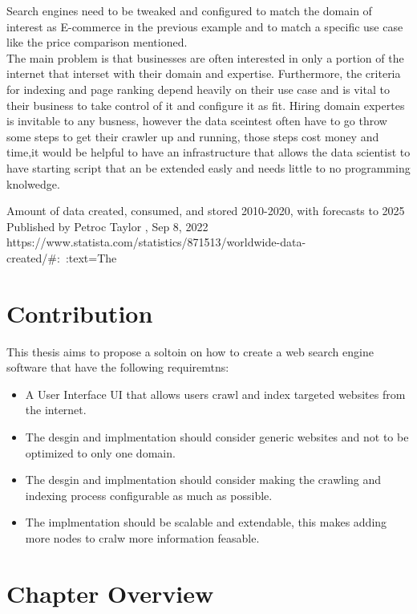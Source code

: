 Search engines need to be tweaked and configured to match the domain of interest as E-commerce in the previous example and to match a specific use case like the price comparison mentioned.\\

The main problem is that businesses are often interested in only a portion of the internet that interset with their domain and expertise. Furthermore, the criteria for indexing and page ranking depend heavily on their use case and is vital to their business to take control of it and configure it as fit. Hiring domain expertes is invitable to any busness, however the data sceintest often have to go throw some steps to get their crawler up and running, those steps cost money and time,it would be helpful to have an infrastructure that allows the data scientist to have starting script that an be extended easly and needs little to no programming knolwedge. 




Amount of data created, consumed, and stored 2010-2020, with forecasts to 2025
Published by 
Petroc Taylor
, Sep 8, 2022
https://www.statista.com/statistics/871513/worldwide-data-created/#:~:text=The%
\section{Contribution}

This thesis aims to propose a soltoin on how to create a web search engine software that have the following requiremtns: 
\begin{itemize}
  \item A User Interface UI that allows users crawl and index targeted websites from the internet.
\item The desgin and implmentation should consider generic websites and not to be optimized to only one domain.
    \item The desgin and implmentation should consider making the crawling and indexing process configurable as much as possible.
    \item The implmentation should be scalable and extendable, this makes adding more nodes to cralw more information feasable.
\end{itemize}
\section{Chapter Overview}
